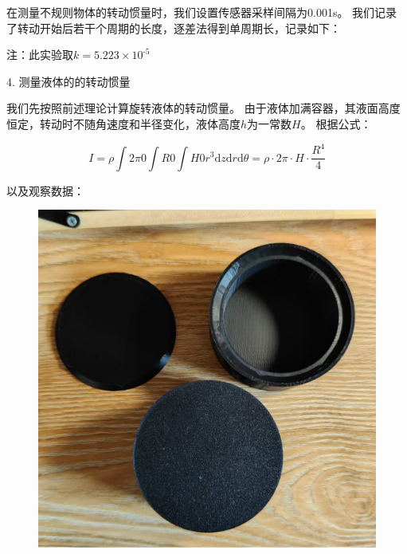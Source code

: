 \documentclass[12pt,hyperref,a4paper,UTF8]{ctexart}
\begin{document}
在测量不规则物体的转动惯量时，我们设置传感器采样间隔为0.001s。
我们记录了转动开始后若干个周期的长度，逐差法得到单周期长，记录如下：

\begin{table}[h!]
\centering
{}
\caption{逐差法测量不规则物体转动周期及其转动惯量}
\end{table}

注：此实验取$ k = \text{5.223} \times \text{10}^{\text{-5}} $

4. 测量液体的的转动惯量

我们先按照前述理论计算旋转液体的转动惯量。
由于液体加满容器，其液面高度恒定，转动时不随角速度和半径变化，液体高度$h$为一常数$H$。
根据公式：

$$ I = \rho \int{2 \pi}{0} \int{R}{0} \int{H}{0} r^3 \text{d}z \text{d}r \text{d}\theta 
    = \rho · 2\pi · H · \frac{R^4}{4} $$

以及观察数据：

\begin{figure}[htbp]
    \centering
    \includegraphics[scale=0.3]{container.eps}
    \caption{}
\end{figure}
\end{document}
